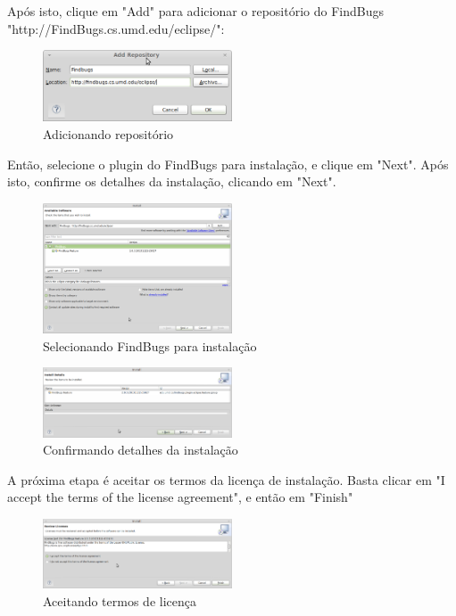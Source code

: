 \documentclass[12pt,journal,compsoc]{IEEEtran}
\begin{document}
Após isto, clique em "Add" para adicionar o repositório do FindBugs "http://FindBugs.cs.umd.edu/eclipse/":

\begin{figure}[ht!]
\centering
\includegraphics[width=0.5\textwidth]{img/eclipse-findbugs-02}
\caption{Adicionando repositório}
\label{eclipse-findbugs-02}
\end{figure} 

Então, selecione o plugin do FindBugs para instalação, e clique em "Next". Após isto, confirme os detalhes da instalação, clicando em "Next".

\begin{figure}[ht!]
\centering
\includegraphics[width=0.5\textwidth]{img/eclipse-findbugs-03}
\caption{Selecionando FindBugs para instalação}
\label{eclipse-findbugs-03}
\end{figure} 

\begin{figure}[ht!]
\centering
\includegraphics[width=0.5\textwidth]{img/eclipse-findbugs-04}
\caption{Confirmando detalhes da instalação}
\label{eclipse-findbugs-04}
\end{figure} 

A próxima etapa é aceitar os termos da licença de instalação. Basta clicar em "I accept the terms of the license agreement", e então em "Finish"

\begin{figure}[ht!]
\centering
\includegraphics[width=0.5\textwidth]{img/eclipse-findbugs-05}
\caption{Aceitando termos de licença}
\label{eclipse-findbugs-05}
\end{figure} 
\end{document}
